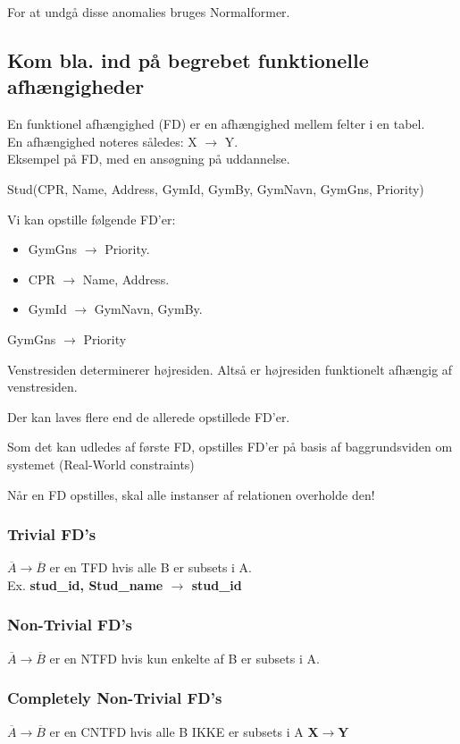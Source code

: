 For at undgå disse anomalies bruges Normalformer.

\subsection{Kom bla. ind på begrebet funktionelle afhængigheder}
En funktionel afhængighed (FD) er en afhængighed mellem felter i en tabel.\\
En afhængighed noteres således: X $\rightarrow$ Y.\\
Eksempel på FD, med en ansøgning på uddannelse.

Stud(CPR, Name, Address, GymId, GymBy, GymNavn, GymGns, Priority)

Vi kan opstille følgende FD'er:
\begin{itemize}
	\item GymGns $\rightarrow$ Priority.
	\item CPR $\rightarrow$ Name, Address.
	\item GymId $\rightarrow$ GymNavn, GymBy.
\end{itemize}GymGns $\rightarrow$ Priority

Venstresiden determinerer højresiden. Altså er højresiden funktionelt afhængig af venstresiden.

Der kan laves flere end de allerede opstillede FD'er.

Som det kan udledes af første FD, opstilles FD'er på basis af baggrundsviden om systemet (Real-World constraints)

Når en FD opstilles, skal alle instanser af relationen overholde den!



\subsubsection{Trivial FD's}

$\overline{A} \rightarrow \overline{B}$ er en TFD hvis alle B er subsets i A.\\
Ex. \textbf{stud\_id, Stud\_name $\rightarrow$ stud\_id}

\subsubsection{Non-Trivial FD's}
$\overline{A} \rightarrow \overline{B}$ er en NTFD hvis kun enkelte af B er subsets i A.
\subsubsection{Completely Non-Trivial FD's}
$\overline{A} \rightarrow \overline{B}$ er en CNTFD hvis alle B IKKE er subsets i A
\textbf{X$\rightarrow$Y}
